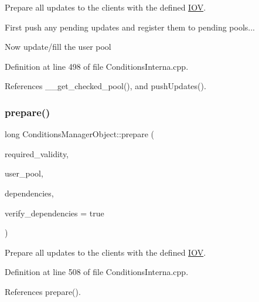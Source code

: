 Prepare all updates to the clients with the defined \hyperlink{class_d_d4hep_1_1_i_o_v}{I\+OV}. 

First push any pending updates and register them to pending pools...

Now update/fill the user pool 

Definition at line 498 of file Conditions\+Interna.\+cpp.



References \+\_\+\+\_\+get\+\_\+checked\+\_\+pool(), and push\+Updates().

\hypertarget{class_d_d4hep_1_1_conditions_1_1_conditions_manager_object_a12104037c413426d82374b639acd88e8}{}\label{class_d_d4hep_1_1_conditions_1_1_conditions_manager_object_a12104037c413426d82374b639acd88e8} 
\subsubsection{\texorpdfstring{prepare()}{prepare()}\hspace{0.1cm}{\footnotesize\ttfamily [4/4]}}
{\footnotesize\ttfamily long Conditions\+Manager\+Object\+::prepare (\begin{DoxyParamCaption}\item[{const \hyperlink{class_d_d4hep_1_1_i_o_v}{I\+OV} \&}]{required\+\_\+validity,  }\item[{\hyperlink{class_d_d4hep_1_1dd4hep__ptr}{dd4hep\+\_\+ptr}$<$ \hyperlink{class_d_d4hep_1_1_conditions_1_1_user_pool}{User\+Pool} $>$ \&}]{user\+\_\+pool,  }\item[{const \hyperlink{class_d_d4hep_1_1_conditions_1_1_conditions_manager_object_a539905074db3aee8b401d575649dbdd8}{Dependencies} \&}]{dependencies,  }\item[{bool}]{verify\+\_\+dependencies = {\ttfamily true} }\end{DoxyParamCaption})}



Prepare all updates to the clients with the defined \hyperlink{class_d_d4hep_1_1_i_o_v}{I\+OV}. 



Definition at line 508 of file Conditions\+Interna.\+cpp.



References prepare().

